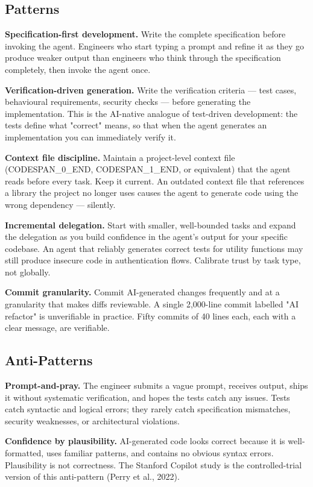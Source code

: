 \documentclass[11pt,a4paper]{book}
\begin{document}
\subsection{Patterns}

\textbf{Specification-first development.} Write the complete specification before invoking the agent. Engineers who start typing a prompt and refine it as they go produce weaker output than engineers who think through the specification completely, then invoke the agent once.

\textbf{Verification-driven generation.} Write the verification criteria --- test cases, behavioural requirements, security checks --- before generating the implementation. This is the AI-native analogue of test-driven development: the tests define what "correct" means, so that when the agent generates an implementation you can immediately verify it.

\textbf{Context file discipline.} Maintain a project-level context file (CODESPAN\_0\_END, CODESPAN\_1\_END, or equivalent) that the agent reads before every task. Keep it current. An outdated context file that references a library the project no longer uses causes the agent to generate code using the wrong dependency --- silently.

\textbf{Incremental delegation.} Start with smaller, well-bounded tasks and expand the delegation as you build confidence in the agent's output for your specific codebase. An agent that reliably generates correct tests for utility functions may still produce insecure code in authentication flows. Calibrate trust by task type, not globally.

\textbf{Commit granularity.} Commit AI-generated changes frequently and at a granularity that makes diffs reviewable. A single 2,000-line commit labelled "AI refactor" is unverifiable in practice. Fifty commits of 40 lines each, each with a clear message, are verifiable.

\subsection{Anti-Patterns}

\textbf{Prompt-and-pray.} The engineer submits a vague prompt, receives output, ships it without systematic verification, and hopes the tests catch any issues. Tests catch syntactic and logical errors; they rarely catch specification mismatches, security weaknesses, or architectural violations.

\textbf{Confidence by plausibility.} AI-generated code looks correct because it is well-formatted, uses familiar patterns, and contains no obvious syntax errors. Plausibility is not correctness. The Stanford Copilot study is the controlled-trial version of this anti-pattern (Perry et al., 2022).
\end{document}
